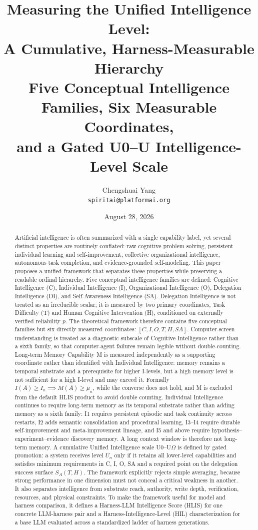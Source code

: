 \documentclass[11pt]{article}
\title{\LARGE Measuring the Unified Intelligence Level:\\[6pt]
A Cumulative, Harness-Measurable Hierarchy\\[8pt]
\large Five Conceptual Intelligence Families, Six Measurable Coordinates,\\
and a Gated U0--U\Om{} Intelligence-Level Scale\\[10pt]
}
\author{Chengshuai Yang\\
\small\texttt{spiritai@platformai.org}}
\date{August 28, 2026}
\theoremstyle{definition}
\newcommand{\Om}{\ensuremath{\Omega}}
\newcommand{\SA}{\ensuremath{S_A(T,H)}}
\begin{document}
\maketitle

\begin{abstract}
Artificial intelligence is often summarized with a single capability label, yet several distinct properties are routinely conflated: raw cognitive problem solving, persistent individual learning and self-improvement, collective organizational intelligence, autonomous task completion, and evidence-grounded self-modeling. This paper proposes a unified framework that separates these properties while preserving a readable ordinal hierarchy. Five conceptual intelligence families are defined: Cognitive Intelligence (C), Individual Intelligence (I), Organizational Intelligence (O), Delegation Intelligence (DI), and Self-Awareness Intelligence (SA). Delegation Intelligence is not treated as an irreducible scalar; it is measured by two primary coordinates, Task Difficulty (T) and Human Cognitive Intervention (H), conditioned on externally verified reliability $p$. The theoretical framework therefore contains five conceptual families but six directly measured coordinates: $[C, I, O, T, H, SA]$. Computer-screen understanding is treated as a diagnostic subscale of Cognitive Intelligence rather than a sixth family, so that computer-agent failures remain legible without double-counting. Long-term Memory Capability M is measured independently as a supporting coordinate rather than identified with Individual Intelligence: memory remains a temporal substrate and a prerequisite for higher I-levels, but a high memory level is not sufficient for a high I-level and may exceed it. Formally $I(A) \ge I_n \implies M(A) \ge \mu_n$, while the converse does not hold, and M is excluded from the default HLIS product to avoid double counting. Individual Intelligence continues to require long-term memory as its temporal substrate rather than adding memory as a sixth family: I1 requires persistent episodic and task continuity across restarts, I2 adds semantic consolidation and procedural learning, I3--I4 require durable self-improvement and meta-improvement lineage, and I5 and above require hypothesis--experiment--evidence discovery memory. A long context window is therefore not long-term memory. A cumulative Unified Intelligence scale U0--U\Om{} is defined by gated promotion: a system receives level $U_n$ only if it retains all lower-level capabilities and satisfies minimum requirements in C, I, O, SA and a required point on the delegation success surface \SA{}. The framework explicitly rejects simple averaging, because strong performance in one dimension must not conceal a critical weakness in another. It also separates intelligence from substrate reach, authority, write depth, verification, resources, and physical constraints. To make the framework useful for model and harness comparison, it defines a Harness-LLM Intelligence Score (HLIS) for one concrete LLM-harness pair and a Harness-Intelligence-Level (HIL) characterization for a base LLM evaluated across a standardized ladder of harness generations.


\end{abstract}
\end{document}
